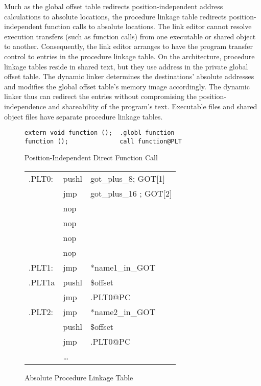 
Much as the global offset table redirects position-independent address
calculations to absolute locations, the procedure linkage table
redirects position-independent function calls to absolute locations.
The link editor cannot resolve execution transfers (such as function
calls) from one executable or shared object to another.  Consequently,
the link editor arranges to have the program transfer control to
entries in the procedure linkage table.  On the \xARCH architecture,
procedure linkage tables reside in shared text, but they use address
in the private global offset table.  The dynamic linker determines the
destinations' absolute addresses and modifies the global offset
table's memory image accordingly.  The dynamic linker thus can
redirect the entries without compromising the position-independence
and shareability of the program's text.  Executable files and shared
object files have separate procedure linkage tables.  



\begin{figure}[H]
\caption{Position-Independent Direct Function Call}
\begin{verbatim}
extern void function ();  .globl function
function ();              call function@PLT
\end{verbatim}
\end{figure}

\begin{figure}[H]
\caption{Absolute Procedure Linkage Table}
\begin{tabular}{lll}
.PLT0: & pushl & got\_plus\_8; GOT[1]\\
& jmp &got\_plus\_16 ; GOT[2] \\
& nop & \\
& nop & \\
& nop & \\
& nop & \\
.PLT1: & jmp & *name1\_in\_GOT\\
.PLT1a& pushl & \$offset \\
&jmp &.PLT0@PC \\
.PLT2: & jmp& *name2\_in\_GOT\\
&pushl & \$offset \\
& jmp & .PLT0@PC \\
&\dots\\
\end{tabular}
\end{figure}

